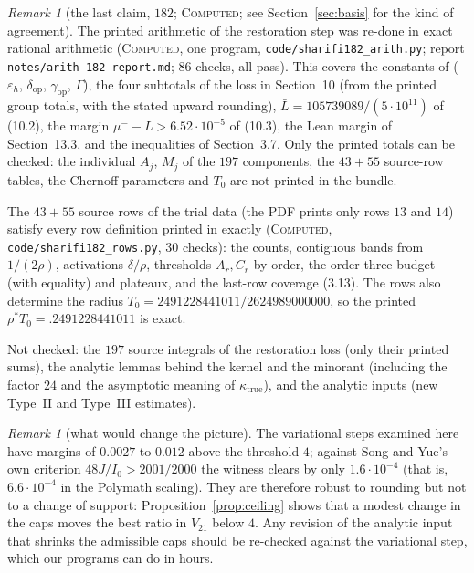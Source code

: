 \documentclass[11pt]{amsart}
\theoremstyle{definition}
\theoremstyle{remark}
\newtheorem{remark}[theorem]{Remark}
\newcommand{\lbl}[1]{\textup{\textsc{#1}}}
\begin{document}
\begin{remark}[the last claim, $182$; \lbl{Computed}; see Section~\ref{sec:basis} for the kind of agreement]
\begin{sloppypar}
The printed arithmetic of the restoration step was re-done in exact rational
arithmetic (\lbl{Computed}, one program, \texttt{code/}\allowbreak\texttt{sharifi182\_arith.py};
report \texttt{notes/}\allowbreak\texttt{arith-182-report.md}; $86$ checks, all pass). This covers
the constants of \cite[(8.3)]{Sha26} ($\varepsilon_h$, $\delta_{\mathrm{op}}$,
$\gamma_{\mathrm{op}}$, $\Gamma$), the four subtotals of the loss in
Section~10 (from the printed group totals, with the stated upward rounding),
$\bar L=105739089/(5\cdot10^{11})$ of (10.2), the margin
$\mu^--\bar L>6.52\cdot10^{-5}$ of (10.3), the Lean margin of Section~13.3,
and the inequalities of Section~3.7. Only the printed totals can be checked:
the individual $A_j$, $M_j$ of the $197$ components, the $43+55$ source-row
tables, the Chernoff parameters and $T_0$ are not printed in the bundle.

The $43+55$ source rows of the trial data (the PDF prints only rows $13$ and $14$)
satisfy every row definition printed in \cite[Sections~3.5--3.6]{Sha26}
exactly (\lbl{Computed}, \texttt{code/}\allowbreak\texttt{sharifi182\_rows.py}, $30$
checks): the counts, contiguous bands from $1/(2\rho)$, activations $\delta/\rho$,
thresholds $A_r,C_r$ by order, the order-three budget (with equality) and
plateaux, and the last-row coverage (3.13). The rows also determine the radius
$T_0=2491228441011/2624989000000$, so the printed $\rho^*T_0=.2491228441011$ is
exact.
\end{sloppypar}

Not checked: the $197$ source integrals of the restoration loss (only their
printed sums), the analytic lemmas behind the kernel and
the minorant (including the factor $24$ and the asymptotic meaning of
$\kappa_{\mathrm{true}}$), and the analytic inputs (new Type~II and Type~III
estimates).
\end{remark}

\begin{remark}[what would change the picture]
The variational steps examined here have margins of $0.0027$ to $0.012$
above the threshold $4$; against Song and Yue's own criterion $48J/I_0>2001/2000$
the witness clears by only $1.6\cdot10^{-4}$ (that is, $6.6\cdot10^{-4}$ in the
Polymath scaling). They are therefore robust to rounding but not to a change of
support: Proposition~\ref{prop:ceiling} shows that a modest change in the caps
moves the best ratio in $V_{21}$ below $4$. Any revision of the analytic input
that shrinks the admissible caps should be re-checked against the variational
step, which our programs can do in hours.
\end{remark}
\end{document}
